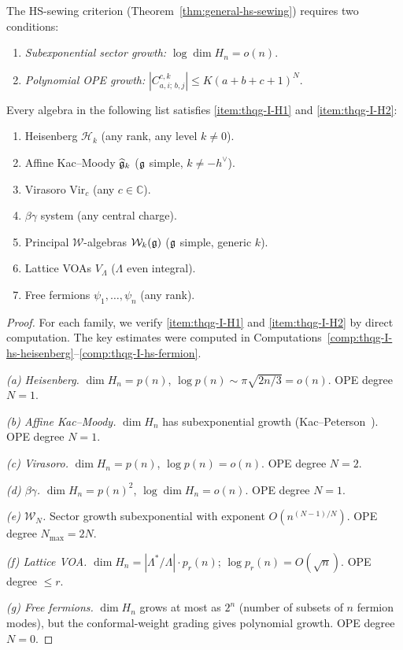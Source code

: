 The HS-sewing criterion (Theorem~\ref{thm:general-hs-sewing}) requires two conditions:
\begin{enumerate}[label=\textbf{(H\arabic*)}]
\item \label{item:thqg-I-H1} \emph{Subexponential sector growth:} $\log \dim H_n = o(n)$.
\item \label{item:thqg-I-H2} \emph{Polynomial OPE growth:} $|C^{c,k}_{a,i;\,b,j}| \leq K(a+b+c+1)^N$.
\end{enumerate}

\begin{proposition}
\label{prop:thqg-I-standard-hs}
Every algebra in the following list satisfies \ref{item:thqg-I-H1} and \ref{item:thqg-I-H2}:
\begin{enumerate}[label=\textup{(\alph*)}]
\item Heisenberg $\mathcal{H}_k$ (any rank, any level $k \neq 0$).
\item Affine Kac--Moody $\widehat{\mathfrak{g}}_k$ ($\mathfrak{g}$ simple, $k \neq -h^\vee$).
\item Virasoro $\mathrm{Vir}_c$ (any $c \in \mathbb{C}$).
\item $\beta\gamma$ system (any central charge).
\item Principal $\mathcal{W}$-algebras $\mathcal{W}_k(\mathfrak{g})$ ($\mathfrak{g}$ simple, generic $k$).
\item Lattice VOAs $V_\Lambda$ ($\Lambda$ even integral).
\item Free fermions $\psi_1, \ldots, \psi_n$ (any rank).
\end{enumerate}
\end{proposition}

\begin{proof}
For each family, we verify \ref{item:thqg-I-H1} and \ref{item:thqg-I-H2} by direct computation. The key estimates were computed in Computations~\ref{comp:thqg-I-hs-heisenberg}--\ref{comp:thqg-I-hs-fermion}.

\emph{(a) Heisenberg.} $\dim H_n = p(n)$, $\log p(n) \sim \pi\sqrt{2n/3} = o(n)$. OPE degree $N = 1$.

\emph{(b) Affine Kac--Moody.} $\dim H_n$ has subexponential growth (Kac--Peterson~\cite{KP84}). OPE degree $N = 1$.

\emph{(c) Virasoro.} $\dim H_n = p(n)$, $\log p(n) = o(n)$. OPE degree $N = 2$.

\emph{(d) $\beta\gamma$.} $\dim H_n = p(n)^2$, $\log \dim H_n = o(n)$. OPE degree $N = 1$.

\emph{(e) $\mathcal{W}_N$.} Sector growth subexponential with exponent $O(n^{(N-1)/N})$. OPE degree $N_{\max} = 2N$.

\emph{(f) Lattice VOA.} $\dim H_n = |\Lambda^*/\Lambda|\cdot p_r(n)$; $\log p_r(n) = O(\sqrt{n})$. OPE degree $\leq r$.

\emph{(g) Free fermions.} $\dim H_n$ grows at most as $2^n$ (number of subsets of $n$ fermion modes), but the conformal-weight grading gives polynomial growth. OPE degree $N = 0$.
\end{proof}

